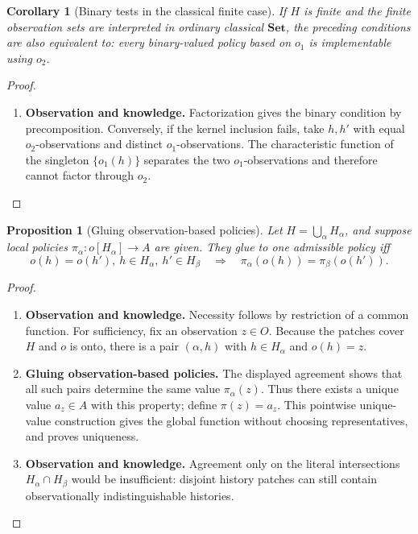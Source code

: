 \documentclass[11pt,a4paper]{article}
\numberwithin{equation}{section}
\newtheorem{proposition}[theorem]{Proposition}
\newtheorem{corollary}[theorem]{Corollary}
\theoremstyle{definition}
\theoremstyle{remark}
\theoremstyle{plain}
\begin{document}
\begin{corollary}[Binary tests in the classical finite case]
If $H$ is finite and the finite observation sets are interpreted in ordinary
classical $\mathbf{Set}$, the preceding conditions are also equivalent to:
every binary-valued policy based on $o_1$ is implementable using $o_2$.
\end{corollary}
\begin{proof}
\leavevmode
\begin{enumerate}[label=\textup{(\arabic*)},leftmargin=*,itemsep=4pt,topsep=3pt]
  \item \textbf{Observation and knowledge.} Factorization gives the binary condition by precomposition. Conversely, if
the kernel inclusion fails, take $h,h'$ with equal $o_2$-observations and
distinct $o_1$-observations. The characteristic function of the singleton
$\{o_1(h)\}$ separates the two $o_1$-observations and therefore cannot factor
through $o_2$.
\end{enumerate}
\end{proof}

\begin{proposition}[Gluing observation-based policies]
Let
$H=\bigcup_\alpha H_\alpha$, and suppose local policies
$\pi_\alpha:o[H_\alpha]\to A$ are given. They glue to one admissible
policy iff
\[
 o(h)=o(h'),\ h\in H_\alpha,\ h'\in H_\beta
 \quad\Longrightarrow\quad
 \pi_\alpha(o(h))=\pi_\beta(o(h')).
\]
\end{proposition}
\begin{proof}
\leavevmode
\begin{enumerate}[label=\textup{(\arabic*)},leftmargin=*,itemsep=4pt,topsep=3pt]
  \item \textbf{Observation and knowledge.} Necessity follows by restriction of a common function. For sufficiency,
fix an observation $z\in O$. Because the patches cover $H$ and $o$ is
onto, there is a pair $(\alpha,h)$ with $h\in H_\alpha$ and $o(h)=z$.
  \item \textbf{Gluing observation-based policies.} The displayed agreement shows that all such pairs determine the same
value $\pi_\alpha(z)$. Thus there exists a unique value $a_z\in A$
with this property; define $\pi(z)=a_z$. This pointwise unique-value
construction gives the global function without choosing representatives,
and proves uniqueness.
  \item \textbf{Observation and knowledge.} Agreement only on the literal intersections
$H_\alpha\cap H_\beta$ would be insufficient: disjoint history patches
can still contain observationally indistinguishable histories.
\end{enumerate}
\end{proof}
\end{document}
